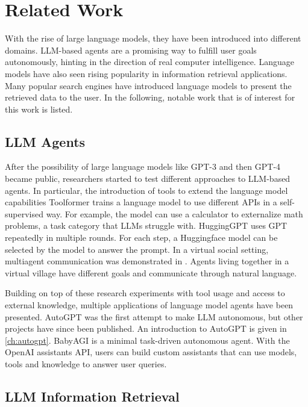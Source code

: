 \documentclass[../main.tex]{subfiles}
\begin{document}
\section{Related Work}

With the rise of large language models, they have been introduced into different domains.
LLM-based agents are a promising way to fulfill user goals autonomously,
hinting in the direction of real computer intelligence.
Language models have also seen rising popularity in information retrieval applications.
Many popular search engines have introduced language models to present the retrieved data to the user.
In the following, notable work that is of interest for this work is listed.

\subsection{LLM Agents}

After the possibility of large language models like GPT-3 and then GPT-4 became public,
researchers started to test different approaches to LLM-based agents.
In particular, the introduction of tools to extend the language model capabilities
Toolformer \cite{Schick2023} trains a language model to use different APIs in a self-supervised way.
For example, the model can use a calculator to externalize math problems,
a task category that LLMs struggle with.
HuggingGPT \cite{Shen2023} uses GPT repeatedly in multiple rounds.
For each step, a Huggingface model can be selected by the model to answer the prompt.
In a virtual social setting, multiagent communication was demonstrated in \autocite{Park2023}.
Agents living together in a virtual village have different goals and communicate through natural language.

Building on top of these research experiments with tool usage and access to external knowledge,
multiple applications of language model agents have been presented.
AutoGPT \cite{SignificantGravitas2024} was the first attempt to make LLM autonomous,
but other projects have since been published.
An introduction to AutoGPT is given in \autoref{ch:autogpt}.
BabyAGI \cite{Nakajima2024} is a minimal task-driven autonomous agent.
With the OpenAI assistants \cite{zotero-195} API,
users can build custom assistants
that can use models, tools and knowledge to answer user queries.


\subsection{LLM Information Retrieval}
\end{document}
